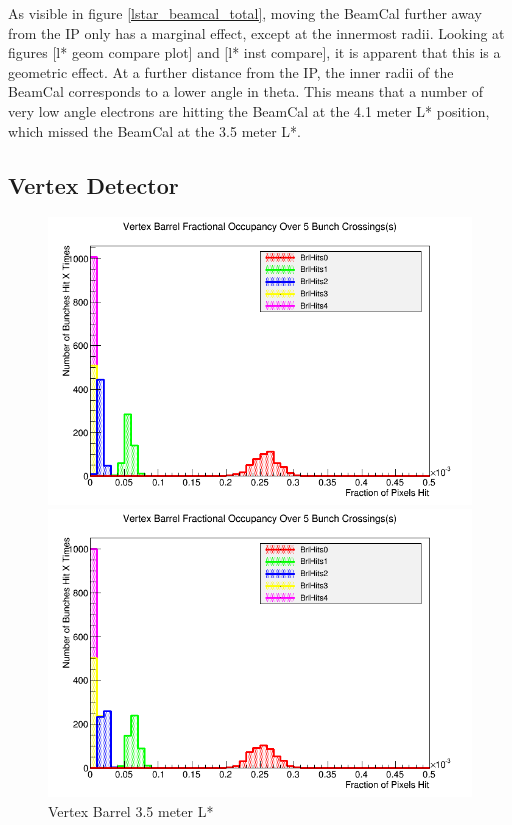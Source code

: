\documentclass{report}
\begin{document}
                As visible in figure \ref{lstar_beamcal_total}, moving the BeamCal further away from the IP only has a marginal effect, except at the innermost radii. Looking at figures [l* geom compare plot] and [l* inst compare], it is apparent that this is a geometric effect. At a further distance from the IP, the inner radii of the BeamCal corresponds to a lower angle in theta. This means that a number of very low angle electrons are hitting the BeamCal at the 4.1 meter L* position, which missed the BeamCal at the 3.5 meter L*.
                
            \subsection{Vertex Detector} 
                \begin{figure}[H]
                    \centering
                    \begin{minipage}{0.4\textwidth}
                        \includegraphics[width=\textwidth]{Voccupancy_sidloi3_IR_realign_preqd0shift_5B_ps30_1510212229_brl}
                        \caption{Vertex Barrel 3.5 meter L*}
                        \label{lstar_vertex_brl_3.5}
                    \end{minipage}
                    \begin{minipage}{0.4\textwidth}
                        \includegraphics[width=\textwidth]{Voccupancy_sidloi3_IR_realign_5B_ps30_1510211229_brl}

\end{minipage}
\end{figure}
\end{document}
